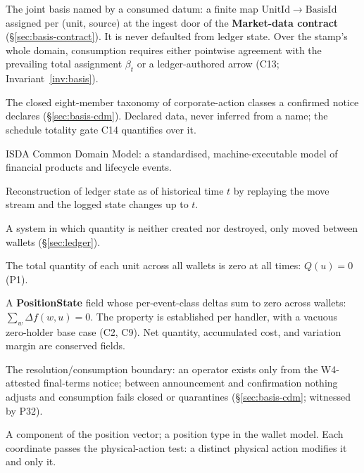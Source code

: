 \begin{description}[style=nextline]
\item[Basis stamp] The joint basis named by a consumed datum: a finite map $\mathrm{UnitId}\to\mathrm{BasisId}$ assigned per (unit, source) at the ingest door of the \textbf{Market-data contract} (\S\ref{sec:basis-contract}). It is never defaulted from ledger state. Over the stamp's whole domain, consumption requires either pointwise agreement with the prevailing total assignment $\beta_t$ or a ledger-authored arrow (C13; Invariant~\ref{inv:basis}).

\item[CAClass] The closed eight-member taxonomy of corporate-action classes a confirmed notice declares (\S\ref{sec:basis-cdm}). Declared data, never inferred from a name; the schedule totality gate C14 quantifies over it.

\item[CDM] ISDA Common Domain Model: a standardised, machine-executable model of financial products and lifecycle events.

\item[Clone\_at($t$)] Reconstruction of ledger state as of historical time $t$ by replaying the move stream and the logged state changes up to $t$.

\item[Closed system] A system in which quantity is neither created nor destroyed, only moved between wallets (\S\ref{sec:ledger}).

\item[Conservation law] The total quantity of each unit across all wallets is zero at all times: $Q(u)=0$ (P1).

\item[Conserved field] A \textbf{PositionState} field whose per-event-class deltas sum to zero across wallets: $\sum_w\Delta f(w,u)=0$. The property is established per handler, with a vacuous zero-holder base case (C2, C9). Net quantity, accumulated cost, and variation margin are conserved fields.

\item[Confirmation gate] The resolution/consumption boundary: an operator exists only from the W4-attested final-terms notice; between announcement and confirmation nothing adjusts and consumption fails closed or quarantines (\S\ref{sec:basis-cdm}; witnessed by P32).

\item[Coordinate] A component of the position vector; a position type in the wallet model. Each coordinate passes the physical-action test: a distinct physical action modifies it and only it.


\end{description}
